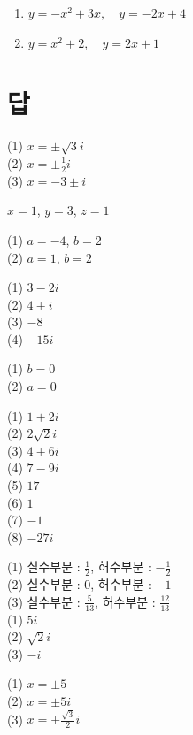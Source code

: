 \documentclass{oblivoir}
\begin{document}
%
\begin{enumerate}\label{grap2}
\item
\(y=-x^2+3x,\quad y=-2x+4\)
\item
\(y=x^2+2,\quad y=2x+1\)
\end{enumerate}



\section*{답}
\begin{minipage}[t]{0.49\textwidth}
%
(1) \(x=\pm\sqrt3i\)\\
(2) \(x=\pm\frac12i\)\\
(3) \(x=-3\pm i\)

%
\(x=1\), \(y=3\), \(z=1\)

%

%
(1) \(a=-4\), \(b=2\)\\
(2) \(a=1\), \(b=2\)

%
(1) \(3-2i\)\\
(2) \(4+i\)\\
(3) \(-8\)\\
(4) \(-15i\)

%
(1) \(b=0\)\\
(2) \(a=0\)
\end{minipage}
\begin{minipage}[t]{0.49\textwidth}
%
(1) \(1+2i\)\\
(2) \(2\sqrt2i\)\\
(3) \(4+6i\)\\
(4) \(7-9i\)\\
(5) \(17\)\\
(6) \(1\)\\
(7) \(-1\)\\
(8) \(-27i\)

%
(1) 실수부분 : \(\frac12\), 허수부분 : \(-\frac12\)\\
(2) 실수부분 : \(0\), 허수부분 : \(-1\)\\
(3) 실수부분 : \(\frac5{13}\), 허수부분 : \(\frac{12}{13}\)\\

%
(1) \(5i\)\\
(2) \(\sqrt2i\)\\
(3) \(-i\)

%

%

%
(1) \(x=\pm5\)\\
(2) \(x=\pm5i\)\\
(3) \(x=\pm\frac{\sqrt3}2i\)
\end{minipage}
\end{document}
